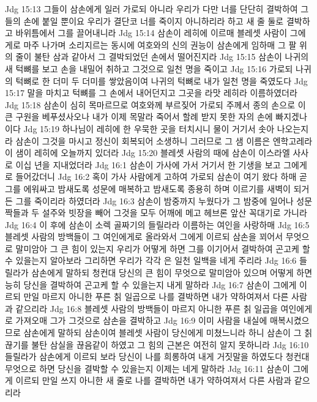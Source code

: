 Jdg 15:13  그들이 삼손에게 일러 가로되 아니라 우리가 다만 너를 단단히 결박하여 그들의 손에 붙일 뿐이요 우리가 결단코 너를 죽이지 아니하리라 하고 새 줄 둘로 결박하고 바위틈에서 그를 끌어내니라
Jdg 15:14  삼손이 레히에 이르매 블레셋 사람이 그에게로 마주 나가며 소리지르는 동시에 여호와의 신의 권능이 삼손에게 임하매 그 팔 위의 줄이 불탄 삼과 같아서 그 결박되었던 손에서 떨어진지라
Jdg 15:15  삼손이 나귀의 새 턱뼈를 보고 손을 내밀어 취하고 그것으로 일천 명을 죽이고
Jdg 15:16  가로되 나귀의 턱뼈로 한 더미 두 더미를 쌓았음이여 나귀의 턱뼈로 내가 일천 명을 죽였도다
Jdg 15:17  말을 마치고 턱뼈를 그 손에서 내어던지고 그곳을 라맛 레히라 이름하였더라
Jdg 15:18  삼손이 심히 목마르므로 여호와께 부르짖어 가로되 주께서 종의 손으로 이 큰 구원을 베푸셨사오나 내가 이제 목말라 죽어서 할례 받지 못한 자의 손에 빠지겠나이다
Jdg 15:19  하나님이 레히에 한 우묵한 곳을 터치시니 물이 거기서 솟아 나오는지라 삼손이 그것을 마시고 정신이 회복되어 소생하니 그러므로 그 샘 이름은 엔학고레라 이 샘이 레히에 오늘까지 있더라
Jdg 15:20  블레셋 사람의 때에 삼손이 이스라엘 사사로 이십 년을 지내었더라
Jdg 16:1  삼손이 가사에 가서 거기서 한 기생을 보고 그에게로 들어갔더니
Jdg 16:2  혹이 가사 사람에게 고하여 가로되 삼손이 여기 왔다 하매 곧 그를 에워싸고 밤새도록 성문에 매복하고 밤새도록 종용히 하며 이르기를 새벽이 되거든 그를 죽이리라 하였더라
Jdg 16:3  삼손이 밤중까지 누웠다가 그 밤중에 일어나 성문짝들과 두 설주와 빗장을 빼어 그것을 모두 어깨에 메고 헤브론 앞산 꼭대기로 가니라
Jdg 16:4  이 후에 삼손이 소렉 골짜기의 들릴라라 이름하는 여인을 사랑하매
Jdg 16:5  블레셋 사람의 방백들이 그 여인에게로 올라와서 그에게 이르되 삼손을 꾀어서 무엇으로 말미암아 그 큰 힘이 있는지 우리가 어떻게 하면 그를 이기어서 결박하여 곤고케 할수 있을는지 알아보라 그리하면 우리가 각각 은 일천 일백을 네게 주리라
Jdg 16:6  들릴라가 삼손에게 말하되 청컨대 당신의 큰 힘이 무엇으로 말미암아 있으며 어떻게 하면 능히 당신을 결박하여 곤고케 할 수 있을는지 내게 말하라
Jdg 16:7  삼손이 그에게 이르되 만일 마르지 아니한 푸른 칡 일곱으로 나를 결박하면 내가 약하여져서 다른 사람과 같으리라
Jdg 16:8  블레셋 사람의 방백들이 마르지 아니한 푸른 칡 일곱을 여인에게로 가져오매 그가 그것으로 삼손을 결박하고
Jdg 16:9  이미 사람을 내실에 매복시켰으므로 삼손에게 말하되 삼손이여 블레셋 사람이 당신에게 미쳤느니라 하니 삼손이 그 칡 끊기를 불탄 삼실을 끊음같이 하였고 그 힘의 근본은 여전히 알지 못하니라
Jdg 16:10  들릴라가 삼손에게 이르되 보라 당신이 나를 희롱하여 내게 거짓말을 하였도다 청컨대 무엇으로 하면 당신을 결박할 수 있을는지 이제는 네게 말하라
Jdg 16:11  삼손이 그에게 이르되 만일 쓰지 아니한 새 줄로 나를 결박하면 내가 약하여져서 다른 사람과 같으리라

